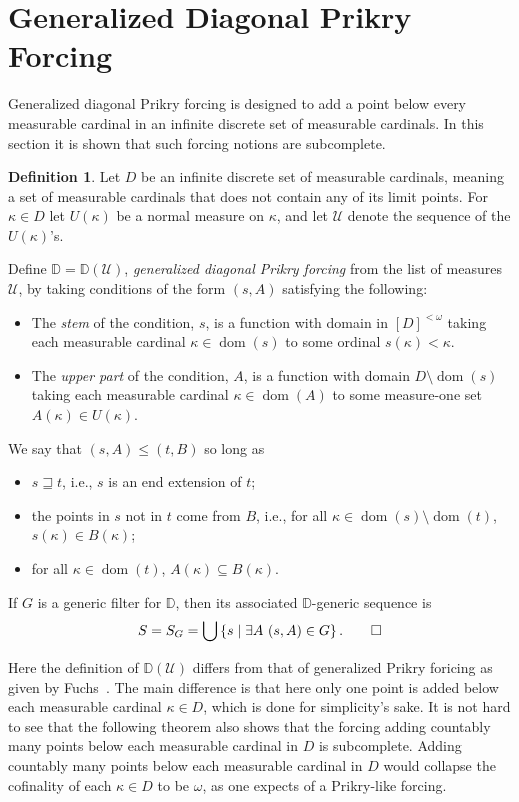 \documentclass{amsart}
\theoremstyle{definition}
\newtheorem{definition}[theorem]{Definition}
\theoremstyle{remark}
\newcommand{\D}{\mathbb{D}}
\newcommand{\U}{\mathcal{U}}
\DeclareMathOperator{\dom}{dom}
\newcommand{\st}{\; | \;}
\newcommand{\set}[2]{\left\{#1\st #2 \right\}}
\begin{document}
\section{Generalized Diagonal Prikry Forcing}
\label{sec:GenDiagonalPrikryForcing}
Generalized diagonal Prikry forcing is designed to add a point below every measurable cardinal in an infinite discrete set of measurable cardinals. In this section it is shown that such forcing notions are subcomplete.
\begin{definition}
Let $D$ be an infinite discrete set of measurable cardinals, meaning a set of measurable cardinals that does not contain any of its limit points. For $\kappa \in D$ let $U(\kappa)$ be a normal measure on $\kappa$, and let $\U$ denote the sequence of the $U(\kappa)$'s.

Define $\D=\D(\U)$, \emph{generalized diagonal Prikry forcing} from the list of measures $\U$, by taking conditions of the form  
$( s, A )$ satisfying the following:
\begin{itemize}
	\item The \textit{stem} of the condition, $s$, is a function with domain in $[D]^{<\omega}$ taking each measurable cardinal $\kappa \in \dom(s)$ to some ordinal $s(\kappa) < \kappa$.
	\item The \textit{upper part} of the condition, $A$, is a function with domain $D \setminus {\dom(s)}$ taking each measurable cardinal $\kappa \in \dom(A)$ to some measure-one set $A(\kappa) \in U(\kappa)$.
\end{itemize}
We say that $( s, A ) \leq ( t, B )$ so long as 
\begin{itemize}
	\item $s \sqsupseteq t$, i.e., $s$ is an end extension of $t$;
	\item the points in $s$ not in $t$ come from $B$, i.e., for all $\kappa \in \dom(s) \setminus \dom(t)$, $s(\kappa) \in B(\kappa)$;
	\item for all $\kappa \in \dom(t)$, $A(\kappa) \subseteq B(\kappa)$.
\end{itemize}
If $G$ is a generic filter for $\D$, then its associated $\D$-generic sequence is \[S = S_G = \bigcup \set{ s }{ \exists A \ ( s, A ) \in G }.\qedhere\]
\end{definition}

Here the definition of $\D(\U)$ differs from that of generalized Prikry foricing as given by Fuchs~\cite{Fuchs:2005kx}. The main difference is that here only one point is added below each measurable cardinal $\kappa \in D$, which is done for simplicity's sake. It is not hard to see that the following theorem also shows that the forcing adding countably many points below each measurable cardinal in $D$ is subcomplete. Adding countably many points below each measurable cardinal in $D$ would collapse the cofinality of each $\kappa \in D$ to be $\omega$, as one expects of a Prikry-like forcing. 
\end{document}
